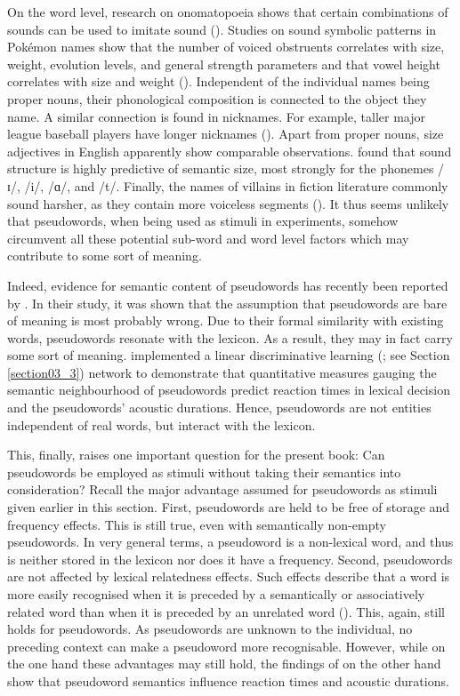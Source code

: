 On the word level, research on onomatopoeia shows that certain combinations of sounds can be used to imitate sound (\cite{Pratha2016}). Studies on sound symbolic patterns in Pokémon names show that the number of voiced obstruents correlates with size, weight, evolution levels, and general strength parameters and that vowel height correlates with size and weight (\cite{Kawahara2018}). Independent of the individual names being proper nouns, their phonological composition is connected to the object they name. A similar connection is found in nicknames. For example, taller major league baseball players have longer nicknames (\cite{Shih2020}). Apart from proper nouns, size adjectives in English apparently show comparable observations. \citet{Winter2021} found that sound structure is highly predictive of semantic size, most strongly for the phonemes /ɪ/, /i/, /ɑ/, and /t/. Finally, the names of villains in fiction literature commonly sound harsher, as they contain more voiceless segments (\cite{Elsen2008}). It thus seems unlikely that pseudowords, when being used as stimuli in experiments, somehow circumvent all these potential sub-word and word level factors which may contribute to some sort of meaning.

Indeed, evidence for semantic content of pseudowords has recently been reported by \citet{Chuang2021}. In their study, it was shown that the assumption that pseudowords are bare of meaning is most probably wrong. Due to their formal similarity with existing words, pseudowords resonate with the lexicon. As a result, they may in fact carry some sort of meaning. \citet{Chuang2021} implemented a linear discriminative learning (\cite{Baayen2019}; see Section \ref{section03_3}) network to demonstrate that quantitative measures gauging the semantic neighbourhood of pseudowords predict reaction times in lexical decision and the pseudowords’ acoustic durations. Hence, pseudowords are not entities independent of real words, but interact with the lexicon.

This, finally, raises one important question for the present book: Can pseudowords be employed as stimuli without taking their semantics into consideration? Recall the major advantage assumed for pseudowords as stimuli given earlier in this section. First, pseudowords are held to be free of storage and frequency effects. This is still true, even with semantically non-empty pseudowords. In very general terms, a pseudoword is a non-lexical word, and thus is neither stored in the lexicon nor does it have a frequency. Second, pseudowords are not affected by lexical relatedness effects. Such effects describe that a word is more easily recognised when it is preceded by a semantically or associatively related word than when it is preceded by an unrelated word (\cite{Schriefers1998}). This, again, still holds for pseudowords. As pseudowords are unknown to the individual, no preceding context can make a pseudoword more recognisable. However, while on the one hand these advantages may still hold, the findings of \citet{Chuang2021} on the other hand show that pseudoword semantics influence reaction times and acoustic durations.

